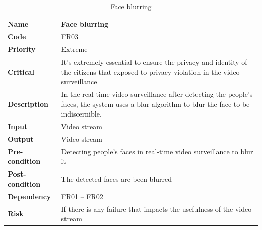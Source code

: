\documentclass[12pt]{article}
\begin{document}
\begin{table}[h!]
\caption{Face blurring}
\begin{tabular}{|p{}|p{}|}
\hline
\textbf{Name}           &  Face blurring \\ \hline
\textbf{Code}           & FR03 \\ \hline
\textbf{Priority}       & Extreme \\ \hline
\textbf{Critical}       & It's extremely essential to ensure the privacy and identity of the citizens that exposed to privacy violation in the video surveillance \\ \hline
\textbf{Description}    &In the real-time video surveillance after detecting the people's faces, the system uses a blur algorithm to blur the face to be indiscernible.  \\ \hline
\textbf{Input}          & Video stream                                           \\ \hline
\textbf{Output}         & Video stream                                             \\ \hline
\textbf{Pre-condition}  & Detecting people's faces in real-time video surveillance to blur it               \\ \hline
\textbf{Post-condition} &The detected faces are been blurred      \\ \hline
\textbf{Dependency}     & FR01 – FR02                                       \\ \hline
\textbf{Risk}           & If there is any failure that impacts the usefulness of the video stream \\ \hline
\end{tabular}
\end{table} 
\end{document}
